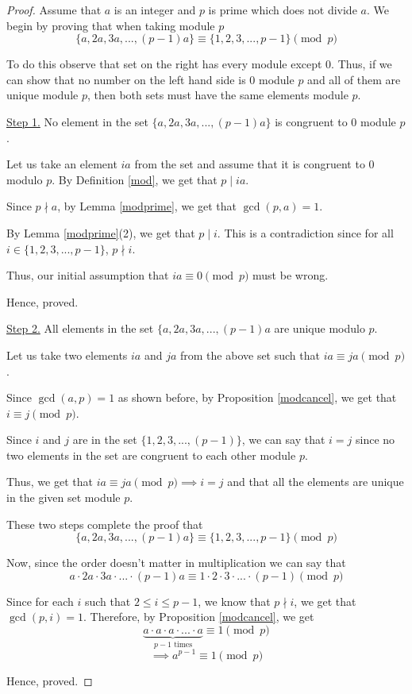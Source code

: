 \begin{proof}
	Assume that $a$ is an integer and $p$ is prime which does not divide $a$. We begin by proving that when taking module $p$
	$$\{a, 2a, 3a, ..., (p-1)a\} \equiv \{1, 2, 3, ..., p-1\} \pmod p$$

	To do this observe that set on the right has every module except $0$. Thus, if we can show that no number on the left hand side is $0$ module $p$ and all of them are unique module $p$, then both sets must have the same elements module $p$.

	\underline{Step 1.} No element in the set $\{a, 2a, 3a, ..., (p-1)a\}$ is congruent to $0$ module $p$.

	Let us take an element $ia$ from the set and assume that it is congruent to $0$ modulo $p$. By Definition \ref{mod}, we get that $p \mid ia$.

	Since $p \nmid a$, by Lemma \ref{modprime}, we get that $\gcd(p, a) = 1$.

	By Lemma \ref{modprime}(2), we get that $p \mid i$. This is a contradiction since for all $i \in \{1, 2, 3, ..., p-1\}$, $p \nmid i$.

	Thus, our initial assumption that $ia \equiv 0 \pmod p$ must be wrong.

	Hence, proved.

	\bigbreak

	\underline{Step 2.} All elements in the set $\{a, 2a, 3a, ..., (p-1)a$ are unique modulo $p$.

		Let us take two elements $ia$ and $ja$ from the above set such that $ia \equiv ja \pmod p$.

		Since $\gcd(a, p) = 1$ as shown before, by Proposition \ref{modcancel}, we get that $i \equiv j \pmod p$.

		Since $i$ and $j$ are in the set $\{1, 2, 3, ..., (p-1)\}$, we can say that $i = j$ since no two elements in the set are congruent to each other module $p$.
	
		Thus, we get that $ia \equiv ja \pmod p \implies i = j$ and that all the elements are unique in the given set module $p$.


		These two steps complete the proof that
		$$\{a, 2a, 3a, ..., (p-1)a\} \equiv \{1, 2, 3, ..., p-1\} \pmod p$$

		Now, since the order doesn't matter in multiplication we can say that 
		$$a \cdot 2a \cdot 3a \cdot ... \cdot (p-1)a \equiv 1 \cdot 2 \cdot 3 \cdot ... \cdot (p-1) \pmod p$$

		Since for each $i$ such that $2 \leq i \leq p-1$, we know that $p \nmid i$, we get that $\gcd(p, i) = 1$. Therefore, by Proposition \ref{modcancel}, we get
		$$\underbrace{a \cdot a \cdot a \cdot ... \cdot a}_{p-1 \text{ times}} \equiv 1 \pmod p$$ 
		$$ \implies a^{p-1} \equiv 1 \pmod p$$

		Hence, proved.
	\end{proof}
